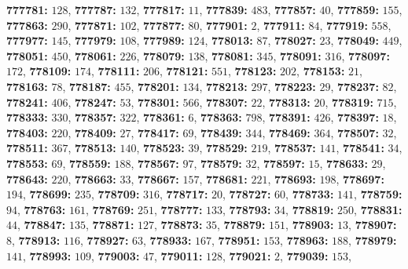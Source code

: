 \textsf{\bfseries 777781:} $128$, \textsf{\bfseries 777787:} $132$, \textsf{\bfseries 777817:} $11$, \textsf{\bfseries 777839:} $483$, \textsf{\bfseries 777857:} $40$, \textsf{\bfseries 777859:} $155$, \textsf{\bfseries 777863:} $290$, \textsf{\bfseries 777871:} $102$, \textsf{\bfseries 777877:} $80$, \textsf{\bfseries 777901:} $2$, \textsf{\bfseries 777911:} $84$, \textsf{\bfseries 777919:} $558$, \textsf{\bfseries 777977:} $145$, \textsf{\bfseries 777979:} $108$, \textsf{\bfseries 777989:} $124$, \textsf{\bfseries 778013:} $87$, \textsf{\bfseries 778027:} $23$, \textsf{\bfseries 778049:} $449$, \textsf{\bfseries 778051:} $450$, \textsf{\bfseries 778061:} $226$, \textsf{\bfseries 778079:} $138$, \textsf{\bfseries 778081:} $345$, \textsf{\bfseries 778091:} $316$, \textsf{\bfseries 778097:} $172$, \textsf{\bfseries 778109:} $174$, \textsf{\bfseries 778111:} $206$, \textsf{\bfseries 778121:} $551$, \textsf{\bfseries 778123:} $202$, \textsf{\bfseries 778153:} $21$, \textsf{\bfseries 778163:} $78$, \textsf{\bfseries 778187:} $455$, \textsf{\bfseries 778201:} $134$, \textsf{\bfseries 778213:} $297$, \textsf{\bfseries 778223:} $29$, \textsf{\bfseries 778237:} $82$, \textsf{\bfseries 778241:} $406$, \textsf{\bfseries 778247:} $53$, \textsf{\bfseries 778301:} $566$, \textsf{\bfseries 778307:} $22$, \textsf{\bfseries 778313:} $20$, \textsf{\bfseries 778319:} $715$, \textsf{\bfseries 778333:} $330$, \textsf{\bfseries 778357:} $322$, \textsf{\bfseries 778361:} $6$, \textsf{\bfseries 778363:} $798$, \textsf{\bfseries 778391:} $426$, \textsf{\bfseries 778397:} $18$, \textsf{\bfseries 778403:} $220$, \textsf{\bfseries 778409:} $27$, \textsf{\bfseries 778417:} $69$, \textsf{\bfseries 778439:} $344$, \textsf{\bfseries 778469:} $364$, \textsf{\bfseries 778507:} $32$, \textsf{\bfseries 778511:} $367$, \textsf{\bfseries 778513:} $140$, \textsf{\bfseries 778523:} $39$, \textsf{\bfseries 778529:} $219$, \textsf{\bfseries 778537:} $141$, \textsf{\bfseries 778541:} $34$, \textsf{\bfseries 778553:} $69$, \textsf{\bfseries 778559:} $188$, \textsf{\bfseries 778567:} $97$, \textsf{\bfseries 778579:} $32$, \textsf{\bfseries 778597:} $15$, \textsf{\bfseries 778633:} $29$, \textsf{\bfseries 778643:} $220$, \textsf{\bfseries 778663:} $33$, \textsf{\bfseries 778667:} $157$, \textsf{\bfseries 778681:} $221$, \textsf{\bfseries 778693:} $198$, \textsf{\bfseries 778697:} $194$, \textsf{\bfseries 778699:} $235$, \textsf{\bfseries 778709:} $316$, \textsf{\bfseries 778717:} $20$, \textsf{\bfseries 778727:} $60$, \textsf{\bfseries 778733:} $141$, \textsf{\bfseries 778759:} $94$, \textsf{\bfseries 778763:} $161$, \textsf{\bfseries 778769:} $251$, \textsf{\bfseries 778777:} $133$, \textsf{\bfseries 778793:} $34$, \textsf{\bfseries 778819:} $250$, \textsf{\bfseries 778831:} $44$, \textsf{\bfseries 778847:} $135$, \textsf{\bfseries 778871:} $127$, \textsf{\bfseries 778873:} $35$, \textsf{\bfseries 778879:} $151$, \textsf{\bfseries 778903:} $13$, \textsf{\bfseries 778907:} $8$, \textsf{\bfseries 778913:} $116$, \textsf{\bfseries 778927:} $63$, \textsf{\bfseries 778933:} $167$, \textsf{\bfseries 778951:} $153$, \textsf{\bfseries 778963:} $188$, \textsf{\bfseries 778979:} $141$, \textsf{\bfseries 778993:} $109$, \textsf{\bfseries 779003:} $47$, \textsf{\bfseries 779011:} $128$, \textsf{\bfseries 779021:} $2$, \textsf{\bfseries 779039:} $153$, 
